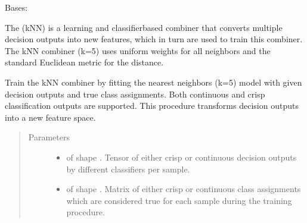 \documentclass[letterpaper,10pt,english]{sphinxmanual}
\begin{document}
\begin{fulllineitems}
\label{\detokenize{pusion.core.k_nearest_neighbors_combiner:pusion.core.k_nearest_neighbors_combiner.KNNCombiner}}
\sphinxAtStartPar
Bases: {\hyperref[\detokenize{pusion.core.combiner:pusion.core.combiner.TrainableCombiner}]{}}

\sphinxAtStartPar
The {\hyperref[\detokenize{pusion.core.k_nearest_neighbors_combiner:pusion.core.k_nearest_neighbors_combiner.KNNCombiner}]{}} (kNN) is a learning and classifier\sphinxhyphen{}based combiner that converts multiple decision
outputs into new features, which in turn are used to train this combiner.
The kNN combiner (k=5) uses uniform weights for all neighbors and the standard Euclidean metric for the distance.

\begin{fulllineitems}
\label{\detokenize{pusion.core.k_nearest_neighbors_combiner:pusion.core.k_nearest_neighbors_combiner.KNNCombiner.train}}
\sphinxAtStartPar
Train the kNN combiner by fitting the  nearest neighbors (k=5) model with given decision outputs and
true class assignments. Both continuous and crisp classification outputs are supported.
This procedure transforms decision outputs into a new feature space.
\begin{quote}\begin{description}
\item[{Parameters}] \leavevmode\begin{itemize}
\item {} 
\sphinxAtStartPar
{} \textendash{}  of shape .
Tensor of either crisp or continuous decision outputs by different classifiers per sample.

\item {} 
\sphinxAtStartPar
{} \textendash{}  of shape .
Matrix of either crisp or continuous class assignments which are considered true for each sample during
the training procedure.


\end{itemize}
\end{description}
\end{quote}
\end{fulllineitems}
\end{fulllineitems}
\end{document}
